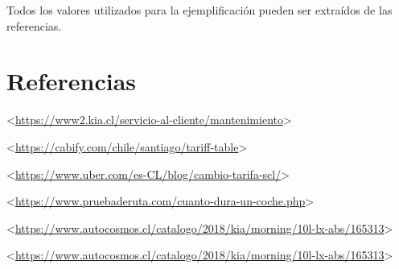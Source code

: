 \documentclass[12pt]{report}
\begin{document}
Todos los valores utilizados para la ejemplificación pueden ser extraídos de las referencias.



\newpage
\section*{Referencias}

<\url{https://www2.kia.cl/servicio-al-cliente/mantenimiento}>
\newline
\newline

<\url{https://cabify.com/chile/santiago/tariff-table}> 
\newline
\newline

<\url{https://www.uber.com/es-CL/blog/cambio-tarifa-scl/}>
\newline
\newline


<\url{https://www.pruebaderuta.com/cuanto-dura-un-coche.php}>
\newline
\newline

<\url{https://www.autocosmos.cl/catalogo/2018/kia/morning/10l-lx-abs/165313}>
\newline
\newline

<\url{https://www.autocosmos.cl/catalogo/2018/kia/morning/10l-lx-abs/165313}>
\newline
\newline
\end{document}
